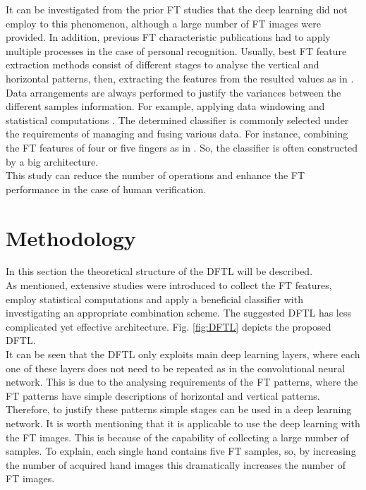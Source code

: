 \documentclass[conference]{IEEEtran}
\begin{document}
It can be investigated from the prior FT studies that the deep learning did not employ to this phenomenon, although a large number of FT images were provided. In addition, previous FT characteristic publications had to apply multiple processes in the case of personal recognition. Usually, best FT feature extraction methods consist of different stages to analyse the vertical and horizontal patterns, then, extracting the features from the resulted values as in \cite{Al-Nima2016Robust} \cite{Al-Nima2017finger} \cite{Al-Nima2017efficient}. Data arrangements are always performed to justify the variances between the different samples information. For example, applying data windowing and statistical computations \cite{Al-Nima2015Human} \cite{Al-Nima2016ANovel}. The determined classifier is commonly selected under the requirements of managing and fusing various data. For instance, combining the FT features of four or five fingers as in \cite{Pavesic2009Finger-based} \cite{Kanhangad2011AUnified} \cite{Al-Nima2016Robust} \cite{Al-Nima2017finger}. So, the classifier is often constructed by a big architecture. \\
This study can reduce the number of operations and enhance the FT performance in the case of human verification. 

\section{Methodology}
In this section the theoretical structure of the DFTL will be described. \\
As mentioned, extensive studies were introduced to collect the FT features, employ statistical computations and apply a beneficial classifier with investigating an appropriate combination scheme. The suggested DFTL has less complicated yet effective architecture. Fig. \ref{fig:DFTL} depicts the proposed DFTL.\\
It can be seen that the DFTL only exploits main deep learning layers, where each one of these layers does not need to be repeated as in the convolutional neural network. This is due to the analysing requirements of the FT patterns, where the FT patterns have simple descriptions of horizontal and vertical patterns. Therefore, to justify these patterns simple stages can be used in a deep learning network. It is worth mentioning that it is applicable to use the deep learning with the FT images. This is because of the capability of collecting a large number of samples. To explain, each single hand contains five FT samples, so, by increasing the number of acquired hand images this dramatically increases the number of FT images. 
\end{document}

